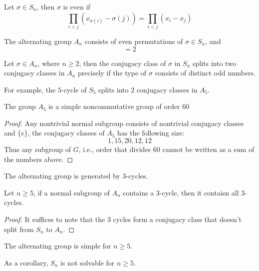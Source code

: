 \documentclass[openany]{book}
\begin{document}
\begin{defn}
    Let $\sigma\in S_n$, then $\sigma$ is even if 
    \begin{equation*}
        \prod_{i<j}(x_{\sigma(i)}-\sigma(j))=\prod_{i<j}(x_i-x_j)
    \end{equation*}
\end{defn}

\begin{defn}
    The alternating group $A_n$ consists of even permutations of $\sigma\in S_n$, and 
    \begin{equation*}
        [S_n:A_n]=2
    \end{equation*}
\end{defn}


\begin{prop}
    Let $\sigma\in A_n$, where $n\geq 2$, then the conjugacy class of $\sigma$ in $S_n$ splits into two conjugacy classes in $A_n$ precisely if the type of $\sigma$ consists of distinct odd numbers. 

    For example, the $5$-cycle of $S_5$ splits into $2$ conjugacy classes in $A_5$.
\end{prop}

\begin{prop}
    The group $A_5$ is a simple noncommutative group of order $60$ 
\end{prop}
\begin{proof}
    Any nontrivial normal subgroup consists of nontrivial conjugacy classes and $\{e\}$, the conjugacy classes of $A_5$ has the following size:
    \begin{equation*}
        1, 15, 20, 12, 12
    \end{equation*}
    Thus any subgroup of $G$, i.e., order that divides $60$ cannot be written as a sum of the numbers above.
\end{proof}

\begin{prop}
    The alternating group is generated by $3$-cycles.
\end{prop}

\begin{prop}
    Let $n\geq 5$, if a normal subgroup of $A_n$ contains a $3$-cycle, then it contaisn all $3$-cycles.
\end{prop}
\begin{proof}
    It suffices to note that the $3$ cycles form a conjugacy class that doesn't split from $S_n$ to $A_n$.
\end{proof}
\begin{thm}
    The alternating group is simple for $n\geq 5$.

    As a corollary, $S_n$ is not solvable for $n\geq 5$.
\end{thm}
\end{document}
